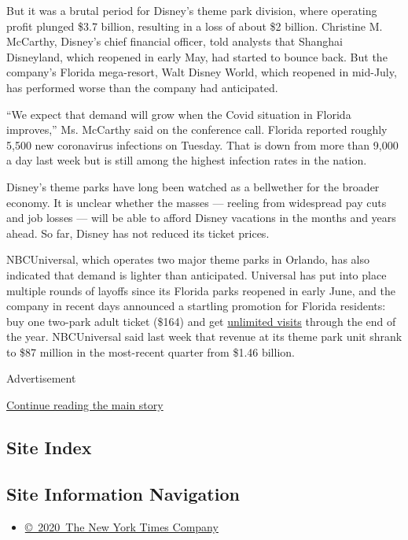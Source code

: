 But it was a brutal period for Disney's theme park division, where
operating profit plunged \$3.7 billion, resulting in a loss of about \$2
billion. Christine M. McCarthy, Disney's chief financial officer, told
analysts that Shanghai Disneyland, which reopened in early May, had
started to bounce back. But the company's Florida mega-resort, Walt
Disney World, which reopened in mid-July, has performed worse than the
company had anticipated.

``We expect that demand will grow when the Covid situation in Florida
improves,'' Ms. McCarthy said on the conference call. Florida reported
roughly 5,500 new coronavirus infections on Tuesday. That is down from
more than 9,000 a day last week but is still among the highest infection
rates in the nation.

Disney's theme parks have long been watched as a bellwether for the
broader economy. It is unclear whether the masses --- reeling from
widespread pay cuts and job losses --- will be able to afford Disney
vacations in the months and years ahead. So far, Disney has not reduced
its ticket prices.

NBCUniversal, which operates two major theme parks in Orlando, has also
indicated that demand is lighter than anticipated. Universal has put
into place multiple rounds of layoffs since its Florida parks reopened
in early June, and the company in recent days announced a startling
promotion for Florida residents: buy one two-park adult ticket (\$164)
and get
\href{https://insidethemagic.net/2020/08/free-access-universal-orlando-ro1/}{unlimited
visits} through the end of the year. NBCUniversal said last week that
revenue at its theme park unit shrank to \$87 million in the most-recent
quarter from \$1.46 billion.

Advertisement

\protect\hyperlink{after-bottom}{Continue reading the main story}

\hypertarget{site-index}{%
\subsection{Site Index}\label{site-index}}

\hypertarget{site-information-navigation}{%
\subsection{Site Information
Navigation}\label{site-information-navigation}}

\begin{itemize}
\tightlist
\item
  \href{https://help.nytimes3xbfgragh.onion/hc/en-us/articles/115014792127-Copyright-notice}{©~2020~The
  New York Times Company}
\end{itemize}

